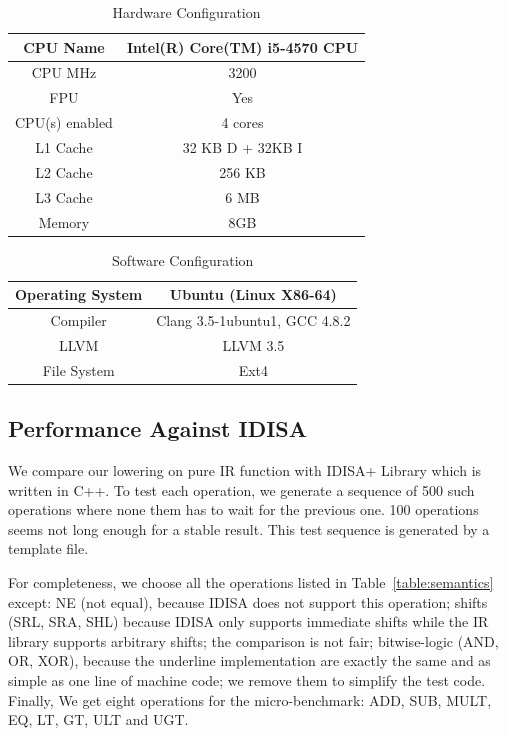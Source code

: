 \begin{table}[h]
\centering
\begin{tabular}{|c|c|}
\hline
CPU Name       & Intel(R) Core(TM) i5-4570 CPU \\ \hline
CPU MHz        & 3200                          \\ \hline
FPU            & Yes                           \\ \hline
CPU(s) enabled & 4 cores                       \\ \hline
L1 Cache       & 32 KB D + 32KB I              \\ \hline
L2 Cache       & 256 KB                        \\ \hline
L3 Cache       & 6 MB                          \\ \hline
Memory         & 8GB                           \\ \hline
\end{tabular}
\caption{Hardware Configuration}
\label{table:hardware_config}
\end{table}

\begin{table}[h]
\centering
\begin{tabular}{|c|c|}
\hline
Operating System & Ubuntu (Linux X86-64)         \\ \hline
Compiler         & Clang 3.5-1ubuntu1, GCC 4.8.2 \\ \hline
LLVM             & LLVM 3.5                      \\ \hline
File System      & Ext4                          \\ \hline
\end{tabular}
\caption{Software Configuration}
\label{table:software_config}
\end{table}

\subsection{Performance Against IDISA}
We compare our lowering on pure IR function with IDISA+ Library \cite{hua_idisa} which is written in C++. To test each operation, we generate a sequence of 500 such operations where none them has to wait for the previous one. 100 operations seems not long enough for a stable result. This test sequence is generated by a template file.

For completeness, we choose all the operations listed in Table~\ref{table:semantics} except: NE (not equal), because IDISA does not support this operation; shifts (SRL, SRA, SHL) because IDISA only supports immediate shifts while the IR library supports arbitrary shifts; the comparison is not fair; bitwise-logic (AND, OR, XOR), because the underline implementation are exactly the same and as simple as one line of machine code; we remove them to simplify the test code. Finally, We get eight operations for the micro-benchmark: ADD, SUB, MULT, EQ, LT, GT, ULT and UGT.

